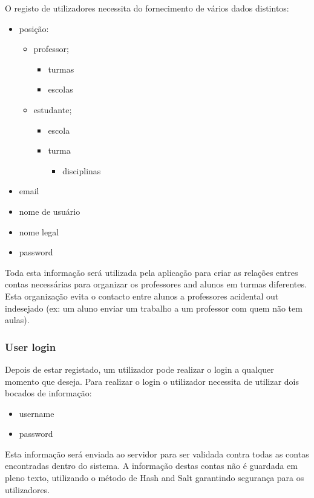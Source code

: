 \documentclass[10pt]{article}
\begin{document}
O registo de utilizadores necessita do fornecimento de vários dados distintos:
\begin{itemize}
    \item posição:
        \begin{itemize}
            \item professor;
                \begin{itemize}
                    \item turmas
                    \item escolas
                \end{itemize}
            \item estudante;
                \begin{itemize}
                    \item escola
                    \item turma
                        \begin{itemize}
                            \item disciplinas
                        \end{itemize}
                \end{itemize}
        \end{itemize}
    \item email
    \item nome de usuário
    \item nome legal
    \item password
\end{itemize}

Toda esta informação será utilizada pela aplicação para criar as relações
entres contas necessárias para organizar os professores and alunos em turmas
diferentes. Esta organização evita o contacto entre alunos a professores acidental
out indesejado (ex: um aluno enviar um trabalho a um professor com quem não tem aulas).

\newpage

\subsubsection{User login}
Depois de estar registado, um utilizador pode realizar o login a qualquer momento que deseja.
Para realizar o login o utilizador necessita de utilizar dois bocados de informação:
\begin{itemize}
    \item username
    \item password
\end{itemize}
Esta informação será enviada ao servidor para ser validada contra todas as contas encontradas
dentro do sistema. A informação destas contas não é guardada em pleno texto, utilizando
o método de Hash and Salt garantindo segurança para os utilizadores.
\end{document}
